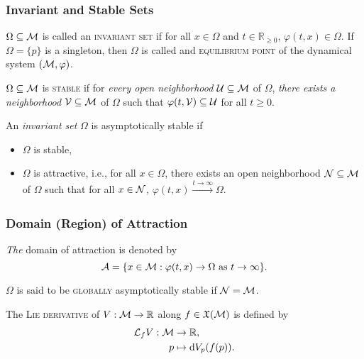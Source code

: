 \begin{frame}
    \frametitle{Invariant and Stable Sets}

    \begin{definition}
        $\Omega \subseteq \mathcal{M}$ is called an \textsc{invariant set} if for all
        $x \in \Omega$ and $t \in \mathbb{R}_{\geq 0}$, $\varphi(t,x) \in
        \Omega$. If $\Omega = \{p\}$ is a singleton, then $\Omega$ is called and
        \textsc{equilibrium point} of the dynamical system $(\mathcal{M}, \varphi)$.
    \end{definition}

    \begin{definition}
        $\Omega \subseteq \mathcal{M}$ is \textsc{stable} if for \textit{every open
        neighborhood} $\mathcal{U} \subseteq \mathcal{M}$ of $\Omega$, \textit{there
        exists a neighborhood} $\mathcal{V} \subseteq \mathcal{M}$ of $\Omega$ such that 
        $\varphi(t, \mathcal{V}) \subseteq \mathcal{U}$ for all $t \geq 0$.

        An \textit{invariant set} $\Omega$ is asymptotically stable if

        \begin{itemize}
            \item $\Omega$ is stable,
            \item $\Omega$ is attractive, i.e., for all $x \in \Omega$, there
            exists an open neighborhood $\mathcal{N} \subseteq \mathcal{M}$ of $\Omega$
            such that for all $x \in \mathcal{N}$, $\varphi(t, x) \xrightarrow[]{t
            \rightarrow \infty} \Omega$.
        \end{itemize}
    \end{definition}
\end{frame}


\begin{frame}
    \frametitle{Domain (Region) of Attraction}

    \textit{The} domain of attraction is denoted by
    \[ \mathcal{A} = \{ x \in \mathcal{M}: \varphi(t,x) \rightarrow \Omega \text{ as } t
    \rightarrow \infty \}. \]

    $\Omega$ is said to be \textsc{globally} asymptotically stable if $\mathcal{N} =
    \mathcal{M}$.

    \begin{definition}
        The \textsc{Lie derivative} of $V: \mathcal{M} \rightarrow \mathbb{R}$ along
        $f \in \mathfrak{X}(\mathcal{M})$ is defined by 
        \begin{align*}
            \mathcal{L}_fV: \mathcal{M} &\rightarrow \mathbb{R}, \\
            p &\mapsto \operatorname{d}\! V_p (f(p)).
        \end{align*}
    \end{definition}
\end{frame}


